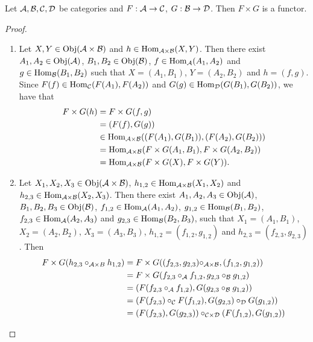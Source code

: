 \documentclass{book}
\begin{document}
	\begin{ex} 
		Let $\mathcal{A}, \mathcal{B}, \mathcal{C}, \mathcal{D}$ be categories and $F: \mathcal{A} \rightarrow \mathcal{C}$, $G: \mathcal{B} \rightarrow \mathcal{D}$. Then $F \times G$ is a functor.
	\end{ex}
	
	\begin{proof}\
		\begin{enumerate}
			\item Let $X, Y \in \operatorname{Obj}(\mathcal{A} \times \mathcal{B})$ and $h \in \operatorname{Hom}_{\mathcal{A} \times \mathcal{B}}(X, Y)$. Then there exist $A_1, A_2 \in \operatorname{Obj}(\mathcal{A})$, $B_1, B_2 \in \operatorname{Obj}(\mathcal{B})$, $f \in \operatorname{Hom}_{\mathcal{A}}(A_1, A_2)$ and $g \in \operatorname{Hom}_{\mathcal{B}}(B_1, B_2)$ such that $X = (A_1, B_1)$, $Y = (A_2, B_2)$ and $h = (f, g)$. Since $F(f) \in \operatorname{Hom}_{\mathcal{C}}(F(A_1), F(A_2))$ and $G(g) \in \operatorname{Hom}_{\mathcal{D}}(G(B_1), G(B_2))$, we have that 
			\begin{align*}
				F \times G(h)
				& = F \times G(f,g) \\
				& = (F(f), G(g)) \\
				& \in \operatorname{Hom}_{\mathcal{A} \times \mathcal{B}} ((F(A_1), G(B_1)), (F(A_2), G(B_2))) \\
				& = \operatorname{Hom}_{\mathcal{A} \times \mathcal{B}} (F \times G(A_1, B_1), F \times G(A_2, B_2)) \\
				& = \operatorname{Hom}_{\mathcal{A} \times \mathcal{B}} (F \times G(X), F \times G(Y) ).
			\end{align*} 
			\item Let $X_1,X_2,X_3 \in \operatorname{Obj}(\mathcal{A} \times \mathcal{B})$, $h_{1,2} \in \operatorname{Hom}_{\mathcal{A} \times \mathcal{B}}(X_1,X_2)$ and $h_{2,3} \in \operatorname{Hom}_{\mathcal{A} \times \mathcal{B}}(X_2, X_3)$. Then there exist $A_1, A_2, A_3 \in \operatorname{Obj}(\mathcal{A})$, $B_1, B_2, B_3 \in \operatorname{Obj}(\mathcal{B})$, $f_{1,2} \in \operatorname{Hom}_{\mathcal{A}}(A_1, A_2)$, $g_{1,2} \in \operatorname{Hom}_{\mathcal{B}}(B_1, B_2)$, $f_{2,3} \in \operatorname{Hom}_{\mathcal{A}}(A_2, A_3)$ and $g_{2,3} \in \operatorname{Hom}_{\mathcal{B}}(B_2, B_3)$, such that $X_1 = (A_1, B_1)$, $X_2 = (A_2, B_2)$, $X_3 = (A_3, B_3)$, $h_{1,2} = (f_{1,2}, g_{1,2})$ and $h_{2,3} = (f_{2,3}, g_{2,3})$. Then 
			\begin{align*}
				F \times G(h_{2,3} \circ_{\MA \times B} h_{1,2}) 
				& = F \times G ((f_{2,3}, g_{2,3}) \circ_{\MA \times \MB}, (f_{1,2}, g_{1,2})) \\
				& = F \times G (f_{2,3} \circ_{\MA} f_{1,2}, g_{2,3} \circ_{\MB} g_{1,2}) \\
				& = (F(f_{2,3} \circ_{\MA} f_{1,2}), G(g_{2,3} \circ_{\MB} g_{1,2})) \\
				& = (F(f_{2,3}) \circ_{\MC} F(f_{1,2}), G(g_{2,3}) \circ_{\MD} G(g_{1,2})) \\
				& = (F(f_{2,3}), G(g_{2,3})) \circ_{\MC \times \MD} (F(f_{1,2}), G(g_{1,2})) \\

\end{align*}
\end{enumerate}
\end{proof}
\end{document}
